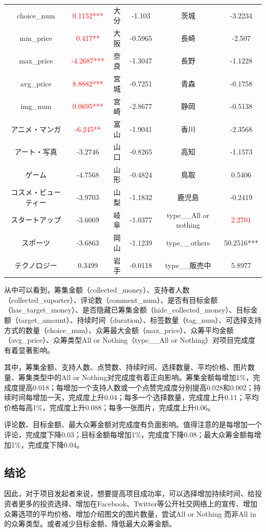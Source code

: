 \documentclass[lang=cn,a4paper]{elegantpaper}
\begin{document}
\begin{table}[!htbp]
\begin{tabular}{cccccc}
  choice\_num&\textcolor{red}{0.1152***}&大分&-1.103&茨城&-3.2234\\
  min\_price&\textcolor{red}{0.417**}&大阪&-0.5965&長崎&-2.507\\
  max\_price&\textcolor{red}{-4.2687***}&奈良&-1.3047&長野&-1.1228\\
  avg\_price&\textcolor{red}{8.8882***}&宮城&-0.7251&青森&-0.1758\\
  img\_num&\textcolor{red}{0.0695***}&宮崎&-2.8677&静岡&-0.5138\\
  アニメ・マンガ&\textcolor{red}{-6.245**}&富山&-1.9041&香川&-2.3568\\
  アート・写真&-3.2746&山口&-0.8265&高知&-1.1573\\
  ゲーム&-4.7568&山形&-0.4824&鳥取&0.5406\\
  コスメ・ビューティー&-3.9703&山梨&-1.1832&鹿児島&-0.2419\\
  スタートアップ&-3.6069&岐阜&-1.0377&type\_\_All or nothing&\textcolor{red}{2.2701}\\
  スポーツ&-3.6863&岡山&-1.1239&type\_\_others&50.2516***\\
  テクノロジー&0.3499&岩手&-0.0118&type\_\_販売中&5.8977\\

  \bottomrule
  \end{tabular}
\label{tbl:回归结果}
\end{table}
从中可以看到，筹集金额（collected\_money）、支持者人数（collected\_suporter）、评论数（comment\_num）、是否有目标金额（has\_target\_money）、是否隐藏已筹集金额（hide\_collected\_money）、目标金额（target\_amount）、持续时间（duration）、标签数量（tag\_num）、可选择支持方式的数量（choice\_num）、众筹最大金额（max\_price）、众筹平均金额（avg\_price）、众筹类型All or Nothing（type\_\_All or Nothing）对项目完成度有着显著影响。

其中，筹集金额、支持人数、点赞数、持续时间、选择数量、平均价格、图片数量、筹集类型中的All or Nothing对完成度有着正向影响。筹集金额每增加1\%，完成度提高0.018；每增加一个支持人数或一个点赞完成度分别提高0.028和0.002；持续时间每增加一天，完成度上升0.04；每多一个选择数量，完成度上升0.11；平均价格每高1\%，完成度上升0.088；每多一张图片，完成度上升0.06。

评论数、目标金额、最大众筹金额对完成度有负面影响。值得注意的是每增加一个评论，完成度下降0.03；目标金额每增加1\%，完成度下降0.08；最大众筹金额每增加1\%，完成度下降0.04。

\subsection{结论}
因此，对于项目发起者来说，想要提高项目成功率，可以选择增加持续时间、给投资者更多的投资选择、增加在Facebook、Twitter等公开社交网络上的宣传、增加众筹选项的平均价格、增加介绍图文的图片数量，尝试All or Nothing 而非All in的众筹类型。或者减少目标金额、降低最大众筹金额。
\end{document}
